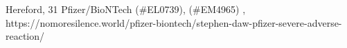           {
            Hereford, 
          }
          {
            31
          }
          {
            Pfizer/BioNTech
          }
          {
             (\#EL0739),
             (\#EM4965)
          }
          {
            ,
          }
          {
            https://nomoresilence.world/pfizer-biontech/stephen-daw-pfizer-severe-adverse-reaction/
          }

